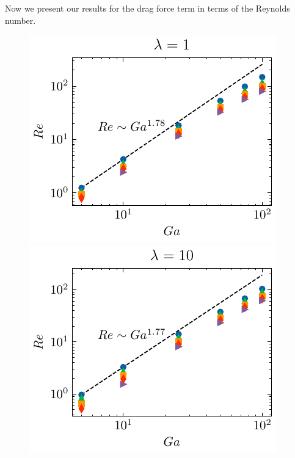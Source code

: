 



Now we present our results for the drag force term in terms of the Reynolds number. 
\begin{figure}[h!]
    \centering
    
    \includegraphics[height = 0.35\textwidth]{image/HOMOGENEOUS/fCA/Re_mu_r_1-0.pdf}
    \includegraphics[height = 0.35\textwidth]{image/HOMOGENEOUS/fCA/Re_mu_r_0-1.pdf}
    

\end{figure}
